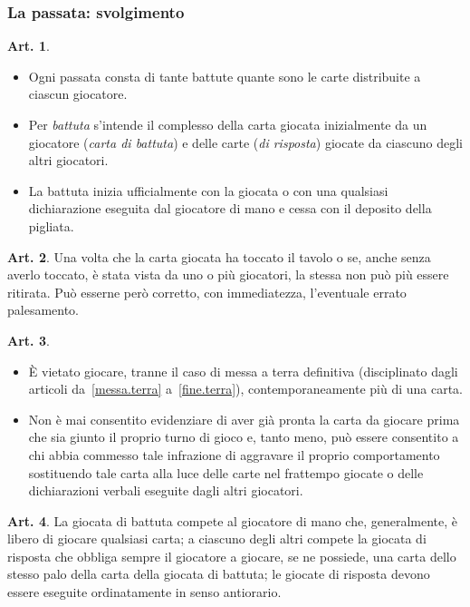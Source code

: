 \documentclass[italian,a4paper]{book}
\theoremstyle{definition}
\newtheorem{art}{Art.}
\newenvironment{packeditem}{
\begin{itemize}
  \setlength{\itemsep}{1pt}
  \setlength{\parskip}{0pt}
  \setlength{\parsep}{0pt}
}{\end{itemize}}
\begin{document}
\subsubsection{La passata: svolgimento}
\begin{art} \hspace*{\fill}
    \begin{packeditem}
\item Ogni passata consta di tante battute quante sono le carte distribuite a ciascun giocatore.
\item Per \emph{battuta} s'intende il complesso della carta giocata
    inizialmente da un giocatore (\emph{carta di battuta}) e delle carte
    (\emph{di risposta}) giocate da ciascuno degli altri giocatori.
\item La battuta inizia ufficialmente con la giocata o con una qualsiasi dichiarazione eseguita dal giocatore di mano e cessa con il deposito della pigliata.
    \end{packeditem}
\end{art}
\begin{art}
    Una volta che la carta giocata ha toccato il tavolo o se, anche senza averlo toccato, è stata vista da uno o più giocatori, la stessa non può più essere ritirata. Può esserne però corretto, con immediatezza, l'eventuale errato palesamento.
\end{art}
\begin{art}   \hspace*{\fill}
    \begin{packeditem}
\item \`E vietato giocare, tranne il caso di messa a terra definitiva
    (disciplinato dagli articoli da~\ref{messa.terra} a~\ref{fine.terra}), contemporaneamente più di una carta.
\item Non è mai consentito evidenziare di aver già pronta la carta da giocare prima che sia giunto il proprio turno di gioco e, tanto meno, può essere consentito a chi abbia commesso tale infrazione di aggravare il proprio comportamento sostituendo tale carta alla luce delle carte nel frattempo giocate o delle dichiarazioni verbali eseguite dagli altri giocatori.
    \end{packeditem}
\end{art}
\begin{art}
    La giocata di battuta compete al giocatore di mano che, generalmente, è libero di giocare qualsiasi carta; a ciascuno degli altri compete la giocata di risposta che obbliga sempre il giocatore a giocare, se ne possiede, una carta dello stesso palo della carta della giocata di battuta; le giocate di risposta devono essere eseguite ordinatamente in senso antiorario.
\end{art}
\end{document}
